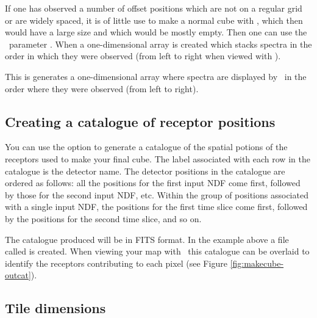 \documentclass[11pt,oneside,chapters]{starlink}
\begin{document}
If one has observed a number of offset positions which are not on a
regular grid or are widely spaced, it is of little use to make a
normal cube with \makecube, which then would have a large size and
which would be mostly empty. Then one can use the \makecube\ parameter
. When  a one-dimensional array is
created which stacks spectra in the order in which they were observed
(from left to right when viewed with \gaia).
\begin{terminalv}
\end{terminalv}
This is generates a one-dimensional array where spectra are displayed by
\gaia\ in the order where they were observed (from left to right).

\subsection{Creating a catalogue of receptor positions}

You can use the option  to generate a catalogue of the
spatial potions of the receptors used to make your final cube. The
label associated with each row in the catalogue is the detector name.
The detector positions in the catalogue are ordered as follows: all
the positions for the first input NDF come first, followed by those
for the second input NDF, etc. Within the group of positions
associated with a single input NDF, the positions for the first time
slice come first, followed by the positions for the second time slice,
and so on.

\begin{terminalv}
\end{terminalv}

The catalogue produced will be in FITS format. In the example above a
file called  is created. When viewing your map with \gaia\ this
catalogue can be overlaid to identify the receptors contributing to
each pixel (see Figure \ref{fig:makecube-outcat}).


\subsection{Tile dimensions}
\end{document}

